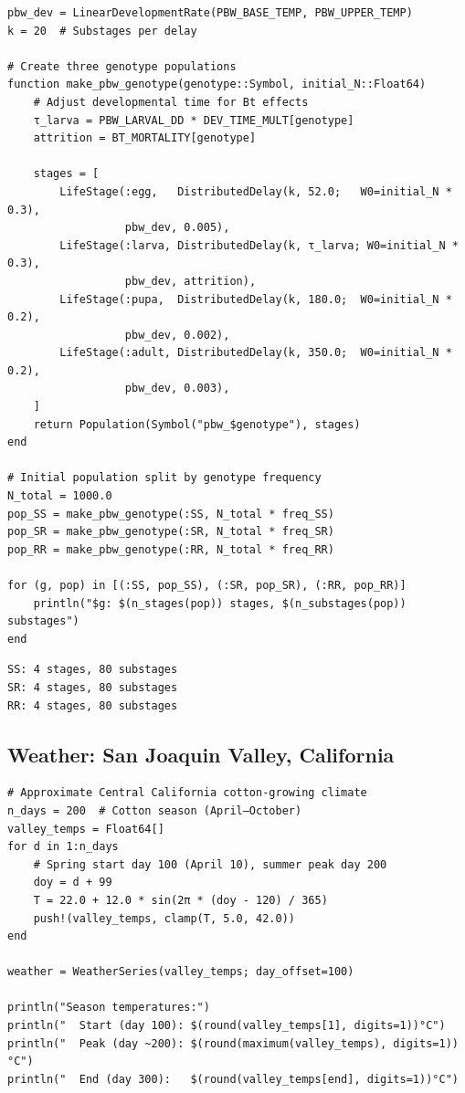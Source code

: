 \begin{verbatim}
pbw_dev = LinearDevelopmentRate(PBW_BASE_TEMP, PBW_UPPER_TEMP)
k = 20  # Substages per delay

# Create three genotype populations
function make_pbw_genotype(genotype::Symbol, initial_N::Float64)
    # Adjust developmental time for Bt effects
    τ_larva = PBW_LARVAL_DD * DEV_TIME_MULT[genotype]
    attrition = BT_MORTALITY[genotype]

    stages = [
        LifeStage(:egg,   DistributedDelay(k, 52.0;   W0=initial_N * 0.3),
                  pbw_dev, 0.005),
        LifeStage(:larva, DistributedDelay(k, τ_larva; W0=initial_N * 0.3),
                  pbw_dev, attrition),
        LifeStage(:pupa,  DistributedDelay(k, 180.0;  W0=initial_N * 0.2),
                  pbw_dev, 0.002),
        LifeStage(:adult, DistributedDelay(k, 350.0;  W0=initial_N * 0.2),
                  pbw_dev, 0.003),
    ]
    return Population(Symbol("pbw_$genotype"), stages)
end

# Initial population split by genotype frequency
N_total = 1000.0
pop_SS = make_pbw_genotype(:SS, N_total * freq_SS)
pop_SR = make_pbw_genotype(:SR, N_total * freq_SR)
pop_RR = make_pbw_genotype(:RR, N_total * freq_RR)

for (g, pop) in [(:SS, pop_SS), (:SR, pop_SR), (:RR, pop_RR)]
    println("$g: $(n_stages(pop)) stages, $(n_substages(pop)) substages")
end
\end{verbatim}




\begin{verbatim}
SS: 4 stages, 80 substages
SR: 4 stages, 80 substages
RR: 4 stages, 80 substages
\end{verbatim}



\subsection{Weather: San Joaquin Valley, California}



\label{12720588064706157171}{}



\begin{verbatim}
# Approximate Central California cotton-growing climate
n_days = 200  # Cotton season (April–October)
valley_temps = Float64[]
for d in 1:n_days
    # Spring start day 100 (April 10), summer peak day 200
    doy = d + 99
    T = 22.0 + 12.0 * sin(2π * (doy - 120) / 365)
    push!(valley_temps, clamp(T, 5.0, 42.0))
end

weather = WeatherSeries(valley_temps; day_offset=100)

println("Season temperatures:")
println("  Start (day 100): $(round(valley_temps[1], digits=1))°C")
println("  Peak (day ~200): $(round(maximum(valley_temps), digits=1))°C")
println("  End (day 300):   $(round(valley_temps[end], digits=1))°C")
\end{verbatim}




